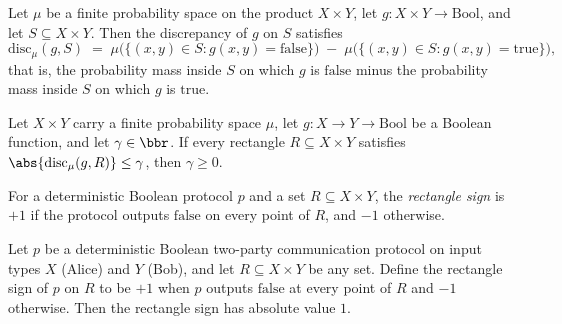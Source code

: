 \begin{theorem}
\label{CommunicationComplexity.discrepancy_eq_prob_false_sub_prob_true}
\leanok
{}
Let $\mu$ be a finite probability space on the product $X \times Y$, let $g : X \times Y
\to \mathrm{Bool}$, and let $S \subseteq X \times Y$. Then the discrepancy of $g$ on $S$
satisfies
\[
  \mathrm{disc}_\mu(g, S)
  \;=\;
  \mu\bigl(\{(x,y) \in S : g(x,y) = \mathrm{false}\}\bigr)
  \;-\;
  \mu\bigl(\{(x,y) \in S : g(x,y) = \mathrm{true}\}\bigr),
\]
that is, the probability mass inside $S$ on which $g$ is $\mathrm{false}$ minus the
probability mass inside $S$ on which $g$ is $\mathrm{true}$.
\end{theorem}

\begin{lemma}
\label{CommunicationComplexity.Deterministic.Protocol.nonneg_of_discrepancy_bound}
\leanok
{}
Let $X \times Y$ carry a finite probability space $\mu$, let $g : X \to Y \to
\mathrm{Bool}$ be a Boolean function, and let $\gamma \in \bbr$. If every rectangle $R
\subseteq X \times Y$ satisfies $\abs{\mathrm{disc}_\mu(g, R)} \le \gamma$, then $\gamma
\ge 0$.
\end{lemma}

\begin{definition}
\label{CommunicationComplexity.Deterministic.Protocol.rectangleSign}
\leanok
{}
For a deterministic Boolean protocol $p$ and a set $R \subseteq X \times Y$, the
\emph{rectangle sign} is $+1$ if the protocol outputs $\mathrm{false}$ on every point of
$R$, and $-1$ otherwise.
\end{definition}

\begin{lemma}
\label{CommunicationComplexity.Deterministic.Protocol.rectangleSign_abs}
\leanok
{}
Let $p$ be a deterministic Boolean two-party communication protocol on input types $X$
(Alice) and $Y$ (Bob), and let $R \subseteq X \times Y$ be any set. Define the rectangle
sign of $p$ on $R$ to be $+1$ when $p$ outputs $\mathrm{false}$ at every point of $R$
and $-1$ otherwise. Then the rectangle sign has absolute value $1$.
\end{lemma}

